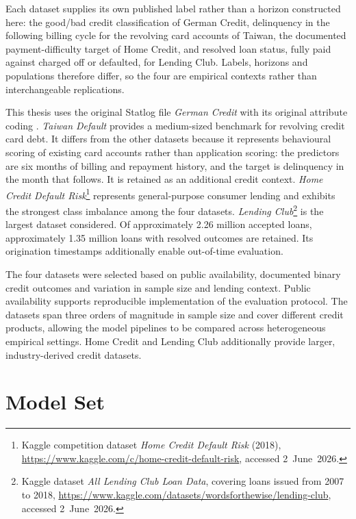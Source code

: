 Each dataset supplies its own published label rather than a horizon constructed here:
the good/bad credit classification of German Credit, delinquency in the following
billing cycle for the revolving card accounts of Taiwan, the documented
payment-difficulty target of Home Credit, and resolved loan status, fully paid against
charged off or defaulted, for Lending Club. Labels, horizons and populations therefore
differ, so the four are empirical contexts rather than interchangeable replications.

This thesis uses the original Statlog file \emph{German Credit} with its original attribute coding \citep{hofmannStatlogGermanCredit1994}. \emph{Taiwan Default} \citep{i-chengyehDefaultCreditCard2009} provides a
medium-sized benchmark for revolving credit card debt. It differs from the other datasets
because it represents behavioural scoring of existing card accounts rather than
application scoring: the predictors are six months of billing and repayment history, and
the target is delinquency in the month that follows. It is retained as an additional
credit context.
\emph{Home Credit Default Risk}\footnote{Kaggle competition dataset
\emph{Home Credit Default Risk} (2018),
\url{https://www.kaggle.com/c/home-credit-default-risk}, accessed 2~June~2026.}
represents general-purpose
consumer lending and exhibits the strongest class imbalance among the four
datasets.
\emph{Lending Club}\footnote{Kaggle dataset
\emph{All Lending Club Loan Data}, covering loans issued from 2007 to 2018,
\url{https://www.kaggle.com/datasets/wordsforthewise/lending-club},
accessed 2~June~2026.}
is the largest dataset considered.
Of approximately 2.26 million accepted loans, approximately 1.35 million loans
with resolved outcomes are retained. Its origination timestamps additionally
enable out-of-time evaluation.

The four datasets were selected based on public availability, documented binary
credit outcomes and variation in sample size and lending context. Public availability supports reproducible
implementation of the evaluation protocol. The datasets span three orders of
magnitude in sample size and cover different credit products, allowing the model
pipelines to be compared across heterogeneous empirical settings. Home Credit and
Lending Club additionally provide larger, industry-derived credit datasets.

\section{Model Set}\label{sec:models}

